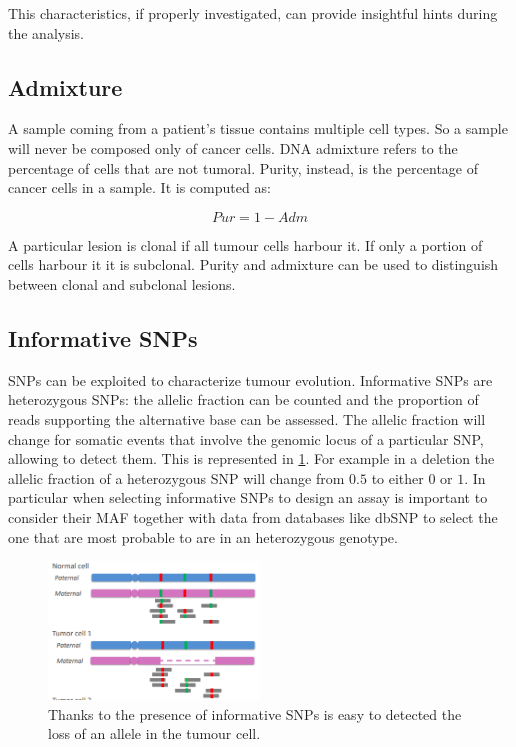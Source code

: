 	This characteristics, if properly investigated, can provide insightful hints during the analysis.

	\subsection{Admixture}
	A sample coming from a patient's tissue contains multiple cell types.
	So a sample will never be composed only of cancer cells.
	DNA admixture refers to the percentage of cells that are not tumoral.
	Purity, instead, is the percentage of cancer cells in a sample.
	It is computed as:

	$$Pur = 1-Adm$$

	A particular lesion is clonal if all tumour cells harbour it.
	If only a portion of cells harbour it it is subclonal.
	Purity and admixture can be used to distinguish between clonal and subclonal lesions.

	\subsection{Informative SNPs}
	SNPs can be exploited to characterize tumour evolution.
	Informative SNPs are heterozygous SNPs: the allelic fraction can be counted and the proportion of reads supporting the alternative base can be assessed.
	The allelic fraction will change for somatic events that involve the genomic locus of a particular SNP, allowing to detect them.
	This is represented in \ref{fig:af_properties}.
	For example in a deletion the allelic fraction of a heterozygous SNP will change from $0.5$ to either $0$ or $1$.
	In particular when selecting informative SNPs to design an assay is important to consider their MAF together with data from databases like dbSNP to select the one that are most probable to are in an heterozygous genotype.

	\begin{figure}[H]
		\centering
		\includegraphics[width=0.5\textwidth]{af_properties.png}
		\caption{Thanks to the presence of informative SNPs is easy to detected the loss of an allele in the tumour cell.}
		\label{fig:af_properties}
	\end{figure}

